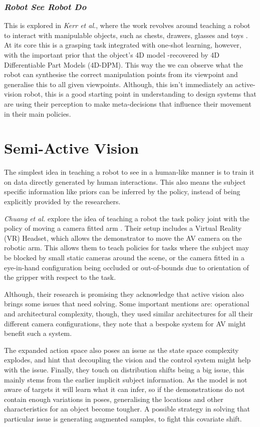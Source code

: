 \subsubsection{\emph{Robot See Robot Do}}
This is explored in \emph{Kerr et al.}, where the work revolves around teaching a robot to interact with manipulable objects, such as chests, drawers, glasses and toys \cite{kerr2024robotrobotdoimitating}. At its core this is a grasping task integrated with one-shot learning, however, with the important prior that the object's 4D model -recovered by 4D Differentiable Part Models (4D-DPM). This way the we can observe what the robot can synthesise the correct manipulation points from its viewpoint and generalise this to all given viewpoints. Although, this isn't immediately an active-vision robot, this is a good starting point in understanding to design systems that are using their perception to make meta-decisions that influence their movement in their main policies. 

\section{Semi-Active Vision}
The simplest idea in teaching a robot to see in a human-like manner is to train it on data directly generated by human interactions. This also means the subject specific information like priors can be inferred by the policy, instead of being explicitly provided by the researchers.

\emph{Chuang et al.} explore the idea of teaching a robot the task policy joint with the policy of moving a camera fitted arm \cite{chuang2024activevisionneedexploring}. Their setup includes a Virtual Reality (VR) Headset, which allows the demonstrator to move the AV camera on the robotic arm. This allows them to teach policies for tasks where the subject may be blocked by small static cameras around the scene, or the camera fitted in a eye-in-hand configuration being occluded or out-of-bounds due to orientation of the gripper with respect to the task. 

Although, their research is promising they acknowledge that active vision also brings some issues that need solving. Some important mentions are: operational and architectural complexity, though, they used similar architectures for all their different camera configurations, they note that a bespoke system for AV might benefit such a system. 

The expanded action space also poses an issue as the state space complexity explodes, and hint that decoupling the vision and the control system might help with the issue. Finally, they touch on distribution shifts being a big issue, this mainly stems from the earlier implicit subject information. As the model is not aware of targets it will learn what it can infer, so if the demonstrations do not contain enough variations in poses, generalising the  locations and other characteristics for an object become tougher. A possible strategy in solving that particular issue is generating augmented samples, to fight this covariate shift.


